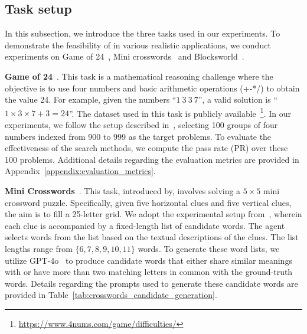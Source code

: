 \subsection{Task setup}
\label{appendix:tasks}
In this subsection, we introduce the three tasks used in our experiments. 
To demonstrate the feasibility of \method in various realistic applications, we conduct experiments on  Game of 24~\cite{yao2023tree}, Mini crosswords~\cite{yao2023tree} and Blocksworld~\cite{valmeekam2022large}.

\noindent \textbf{Game of 24}~\cite{yao2023tree}. This task is a mathematical reasoning challenge where the objective is to use four numbers and basic arithmetic operations (+-*/) to obtain the value 24. For example, given the numbers ``$1\ 3\ 3\  7$'', a valid solution is ``$1\times3\times7+3=24$''. The dataset used in this task is publicly available~\footnote{\url{https://www.4nums.com/game/difficulties/}}.
In our experiments, we follow the setup described in~\cite{yao2023tree}, selecting 100 groups of four numbers indexed from 900 to 999 as the target problems. To evaluate the effectiveness of the search methods, we compute the pass rate (PR) over these 100 problems. Additional details regarding the evaluation metrics are provided in Appendix~\ref{appendix:evaluation_metrics}.

\noindent \textbf{Mini Crosswords}~\cite{yao2023tree}. This task, introduced by\cite{yao2023tree}, involves solving a $5 \times 5$ mini crossword puzzle. Specifically, given five horizontal clues and five vertical clues, the aim is to fill a 25-letter grid. We adopt the experimental setup from~\cite{cao2024automating}, wherein each clue is accompanied by a fixed-length list of candidate words. The agent selects words from the list based on the textual descriptions of the clues. The list lengths range from $\{6, 7 , 8 , 9 , 10, 11\}$ words. To generate these word lists, we utilize GPT-4o~\cite{gpt4ocard} to produce candidate words that either share similar meanings with or have more than two matching letters in common with the ground-truth words. Details regarding the prompts used to generate these candidate words are provided in Table~\ref{tab:crosswords_candidate_generation}.

